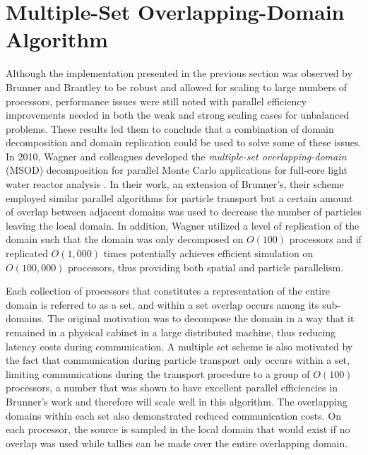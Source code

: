 \clearpage

\section{Multiple-Set Overlapping-Domain Algorithm\ }
\label{subsec:msod}
Although the implementation presented in the previous section was
observed by Brunner and Brantley to be robust and allowed for scaling
to large numbers of processors, performance issues were still noted
with parallel efficiency improvements needed in both the weak and
strong scaling cases for unbalanced problems. These results led them
to conclude that a combination of domain decomposition and domain
replication could be used to solve some of these issues. In 2010,
Wagner and colleagues developed the \textit{multiple-set
  overlapping-domain} (MSOD) decomposition for parallel Monte Carlo
applications for full-core light water reactor analysis
\citep{wagner_hybrid_2010}. In their work, an extension of Brunner's,
their scheme employed similar parallel algorithms for particle
transport but a certain amount of overlap between adjacent domains was
used to decrease the number of particles leaving the local domain. In
addition, Wagner utilized a level of replication of the domain such
that the domain was only decomposed on $O(100)$ processors and if
replicated $O(1,000)$ times potentially achieves efficient simulation
on $O(100,000)$ processors, thus providing both spatial and particle
parallelism.

Each collection of processors that constitutes a representation of the
entire domain is referred to as a set, and within a set overlap occurs
among its sub-domains. The original motivation was to decompose the
domain in a way that it remained in a physical cabinet in a large
distributed machine, thus reducing latency costs during
communication. A multiple set scheme is also motivated by the fact
that communication during particle transport only occurs within a set,
limiting communications during the transport procedure to a group of
$O(100)$ processors, a number that was shown to have excellent
parallel efficiencies in Brunner's work and therefore will scale well
in this algorithm. The overlapping domains within each set also
demonstrated reduced communication costs. On each processor, the
source is sampled in the local domain that would exist if no overlap
was used while tallies can be made over the entire overlapping domain.

